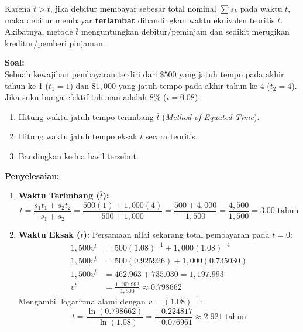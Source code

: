 \documentclass[11pt,a4paper]{article}
\begin{document}
\begin{notebox}
Karena $\bar{t} > t$, jika debitur membayar sebesar total nominal $\sum s_k$ pada waktu $\bar{t}$, maka debitur membayar \textbf{terlambat} dibandingkan waktu ekuivalen teoritis $t$. Akibatnya, metode $\bar{t}$ menguntungkan debitur/peminjam dan sedikit merugikan kreditur/pemberi pinjaman.
\end{notebox}

\begin{examplebox}
\textbf{Soal:}\\
Sebuah kewajiban pembayaran terdiri dari $\$500$ yang jatuh tempo pada akhir tahun ke-1 ($t_1 = 1$) dan $\$1{,}000$ yang jatuh tempo pada akhir tahun ke-4 ($t_2 = 4$). Jika suku bunga efektif tahunan adalah $8\%$ ($i = 0.08$):
\begin{enumerate}[label=(\alph*)]
    \item Hitung waktu jatuh tempo terimbang $\bar{t}$ (\textit{Method of Equated Time}).
    \item Hitung waktu jatuh tempo eksak $t$ secara teoritis.
    \item Bandingkan kedua hasil tersebut.
\end{enumerate}

\vspace{0.5em}
\textbf{Penyelesaian:}\\
\begin{enumerate}[label=(\alph*)]
    \item \textbf{Waktu Terimbang ($\bar{t}$):}
    \begin{equation*}
        \bar{t} = \frac{s_1 t_1 + s_2 t_2}{s_1 + s_2} = \frac{500(1) + 1{,}000(4)}{500 + 1{,}000} = \frac{500 + 4{,}000}{1{,}500} = \frac{4{,}500}{1{,}500} = 3.00 \text{ tahun}
    \end{equation*}

    \item \textbf{Waktu Eksak ($t$):}
    Persamaan nilai sekarang total pembayaran pada $t = 0$:
    \begin{align*}
        1{,}500 v^t &= 500(1.08)^{-1} + 1{,}000(1.08)^{-4} \\[0.4em]
        1{,}500 v^t &= 500(0.925926) + 1{,}000(0.735030) \\[0.4em]
        1{,}500 v^t &= 462.963 + 735.030 = 1{,}197.993 \\[0.4em]
        v^t &= \frac{1{,}197.993}{1{,}500} \approx 0.798662
    \end{align*}
    Mengambil logaritma alami dengan $v = (1.08)^{-1}$:
    \begin{equation*}
        t = \frac{\ln(0.798662)}{-\ln(1.08)} = \frac{-0.224817}{-0.076961} \approx 2.921 \text{ tahun}
    \end{equation*}


\end{enumerate}
\end{examplebox}
\end{document}
